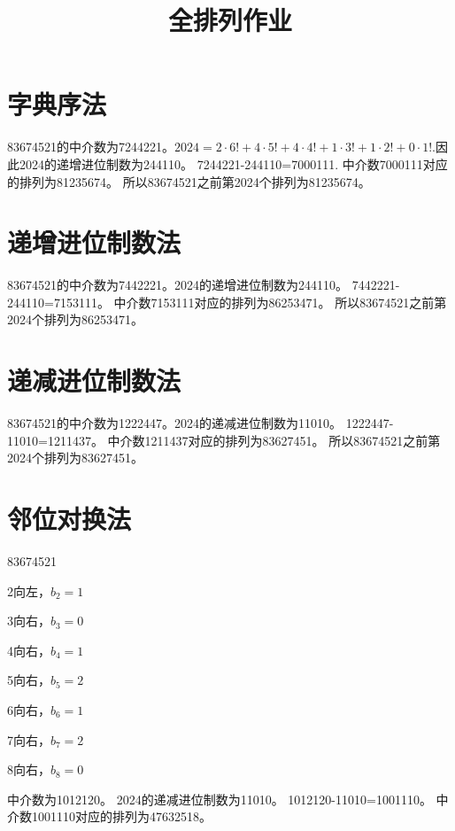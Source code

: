 \documentclass{article}
\begin{document}
 
 
\title{全排列作业}
\maketitle
\section{字典序法}
83674521的中介数为7244221。$2024=2\cdot 6! + 4\cdot 5! + 4\cdot 4! + 1\cdot 3! + 1\cdot 2! + 0\cdot 1!.$因此2024的递增进位制数为244110。
7244221-244110=7000111.
中介数7000111对应的排列为81235674。
所以83674521之前第2024个排列为81235674。
\section{递增进位制数法}
83674521的中介数为7442221。2024的递增进位制数为244110。
7442221-244110=7153111。
‌中介数7153111对应的排列为86253471。
所以83674521之前第2024个排列为86253471。
\section{递减进位制数法}
83674521的中介数为1222447。2024的递减进位制数为11010。
1222447-11010=1211437。
‌中介数1211437对应的排列为83627451。
所以83674521之前第2024个排列为83627451。
\section{邻位对换法}
83674521

2向左，$b_2 = 1$

3向右，$b_3 = 0$

4向右，$b_4 = 1$

5向右，$b_5 = 2$

6向右，$b_6 = 1$

7向右，$b_7 = 2$

8向右，$b_8 = 0$

中介数为1012120。
2024的递减进位制数为11010。
1012120-11010=1001110。
‌中介数1001110对应的排列为47632518。
\end{document}
